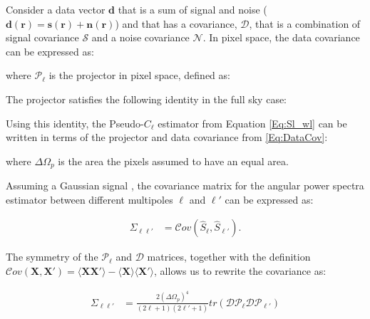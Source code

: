 \qquad Consider a data vector $\textbf{d}$ that is a sum of signal and noise ($\textbf{d}(\textbf{r}) = \textbf{s}(\textbf{r}) + \textbf{n}(\textbf{r})$) and that has a covariance, $\mathcal{D}$, that is a combination of signal covariance $\mathcal{S}$ and a noise covariance $\mathcal{N}$. In pixel space, the data covariance can be expressed as:

 where $\mathcal{P}_{\ell}$ is the projector in pixel space, defined as:
 
The projector satisfies the following identity in the full sky case:

Using this identity, the Pseudo-$C_{\ell}$ estimator from Equation \eqref{Eq:Sl_wl} can be written in terms of the projector and data covariance from \eqref{Eq:DataCov}:


\noindent where $\Delta\Omega_p$ is the area the pixels assumed to have an equal area.

\qquad Assuming a Gaussian signal \citep{Blake2007}, the covariance matrix for the angular power spectra estimator between different multipoles $\ell$ and $\ell'$ can be expressed as:

\begin{align}
\Sigma_{\ell \ell'} & = \mathcal{C}ov(\hat{S}_{\ell}, \hat{S}_{\ell'}).
\label{Eq:ThCovSimple}
\end{align}

\qquad The symmetry of the $\mathcal{P}_{\ell}$ and $\mathcal{D}$ matrices, together with the definition $\mathcal{C}ov(\textbf{X},\textbf{X}') = \langle \textbf{XX}'\rangle - \langle \textbf{X}\rangle\langle \textbf{X}'\rangle$, allows us to rewrite the covariance as:

\begin{align}
\Sigma_{\ell \ell'}& = \frac{2(\Delta\Omega_p)^4}{(2\ell+1)(2\ell'+1)}tr(\mathcal{D}\mathcal{P}_{\ell}\mathcal{D}\mathcal{P}_{\ell'})
\label{Eq:CovTrace}
\end{align}

